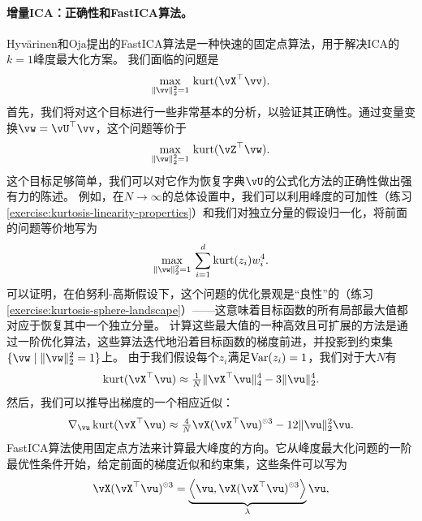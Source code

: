 \documentclass[../../book-main_zh.tex]{subfiles}
\begin{document}
\paragraph{增量ICA：正确性和FastICA算法。}
Hyv\"{a}rinen和Oja提出的FastICA算法\cite{hyvarinen-1997}是一种快速的固定点算法，用于解决ICA的$k=1$峰度最大化方案。
我们面临的问题是
\begin{equation}\label{eq:kurtosis-maximization-sphere-finitesample}
    \max_{\norm{\vv}_2^2 = 1}\, \kurt(\vX^\top \vv).
\end{equation}
首先，我们将对这个目标进行一些非常基本的分析，以验证其正确性。通过变量变换$\vw = \vU^\top \vv$，这个问题等价于
\begin{equation*}
    \max_{\norm{\vw}_2^2 = 1}\, 
    \mathrm{kurt}(\vZ^\top \vw).
\end{equation*}
这个目标足够简单，我们可以对它作为恢复字典$\vU$的公式化方法的正确性做出强有力的陈述。
例如，在$N \to \infty$的总体设置中，我们可以利用峰度的可加性（练习\ref{exercise:kurtosis-linearity-properties}）和我们对独立分量的假设归一化，将前面的问题等价地写为
\begin{equation}\label{eq:kurtosis-maximization-sphere-population-simple}
    \max_{\norm{\vw}_2^2 = 1}\, 
    \sum_{i=1}^d \mathrm{kurt}(z_i) w_i^4.
\end{equation}
可以证明，在伯努利-高斯假设下，这个问题的优化景观是“良性”的（练习\ref{exercise:kurtosis-sphere-landscape}）——这意味着目标函数的所有局部最大值都对应于恢复其中一个独立分量。
计算这些最大值的一种高效且可扩展的方法是通过一阶优化算法，这些算法迭代地沿着目标函数的梯度前进，并投影到约束集$\set{\vw \given \norm{\vw}_2^2 = 1}$上。
由于我们假设每个$z_i$满足$\operatorname{Var}(z_i)=1$，我们对于大$N$有
\begin{equation}\label{eq:kurtosis-approximation-l4}
    \kurt(\vX^\top \vu)
    \approx
    \tfrac{1}{N} \norm{\vX^\top \vu}_4^4 - 3 \norm{\vu}_2^4.
\end{equation}
然后，我们可以推导出梯度的一个相应近似：
\begin{equation*}
    \nabla_{\vu} \kurt(\vX^\top \vu)
    \approx
    \tfrac{4}{N} \vX (\vX^\top \vu)^{\hada 3}
    - 12 \norm{\vu}_2^2 \vu.
\end{equation*}
FastICA算法使用固定点方法来计算最大峰度的方向。它从峰度最大化问题的一阶最优性条件开始，给定前面的梯度近似和约束集，这些条件可以写为
\begin{align}\label{eq:kurtosis-max-sphere-stationarity}
   \vX (\vX^\top \vu)^{\hada 3} 
   = 
   \underbrace{
   \ip*{\vu}{
   \vX (\vX^\top \vu)^{\hada 3} 
   }}_{\lambda} \vu,
\end{align}
\end{document}
